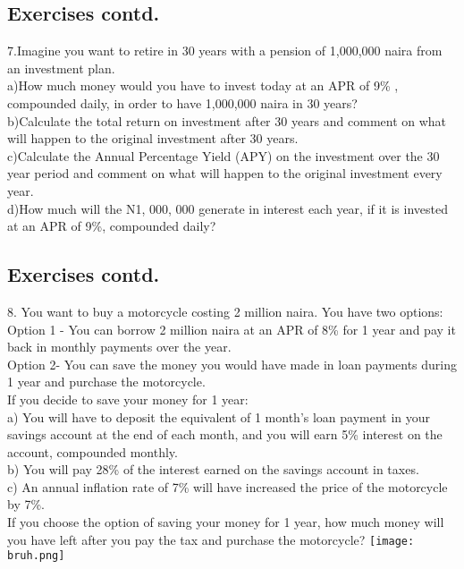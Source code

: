 \documentclass{article}
\begin{document}
		\subsection{Exercises contd.}
		7.Imagine you want to retire in 30 years with a pension of 1,000,000 naira from an investment plan. \\ 
		a)How much money would you have to invest today at an APR of 9\% , compounded daily, in order to have 1,000,000 naira in 30 years? \\
		b)Calculate the total return on investment after 30 years and comment on what will happen to the original investment after 30 years.\\
		c)Calculate the Annual Percentage Yield (APY) on the investment over the 30 year period and comment on what will happen to the original investment every year.\\
		d)How much will the N1, 000, 000 generate in interest each year, if it is invested at an APR of 9\%, compounded daily?
		\newpage
		\subsection{Exercises contd.}
		8.  You want to buy a motorcycle costing 2 million naira. You have two options:
		Option 1 - You can borrow 2 million naira at an APR of 8\% for 1 year and pay it back in monthly payments over the year.\\
		Option 2-   You can save the money you would have made in loan payments during 1 year and purchase the motorcycle.\\
		If you decide to save your money for 1 year:
\\
		a) You will have to deposit the equivalent of 1 month’s loan payment in your savings account at the end of each month, and you will earn 5\% interest on the account, compounded monthly. \\
		b) You will pay 28\% of the interest earned on the savings account in taxes. \\
		c) An annual inflation rate of 7\% will have increased the price of the motorcycle by 7\%.\\
		If you choose the option of saving your money for 1 year, how much money will you have left after you pay the tax and purchase the motorcycle?
		\newpage
		\texttt{[image: bruh.png]}
	
\end{document}
